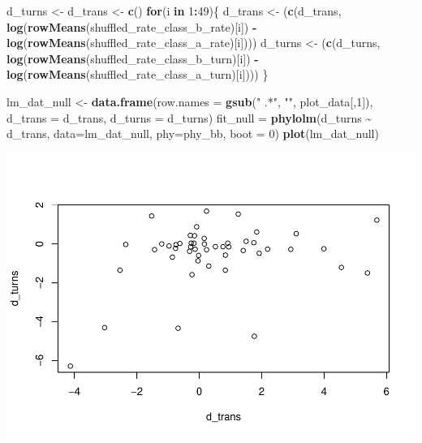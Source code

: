 \documentclass[
]{article}
\newenvironment{Shaded}{\begin{snugshade}}{\end{snugshade}}
\newcommand{\AttributeTok}[1]{\textcolor[rgb]{0.13,0.29,0.53}{#1}}
\newcommand{\ControlFlowTok}[1]{\textcolor[rgb]{0.13,0.29,0.53}{\textbf{#1}}}
\newcommand{\DecValTok}[1]{\textcolor[rgb]{0.00,0.00,0.81}{#1}}
\newcommand{\FunctionTok}[1]{\textcolor[rgb]{0.13,0.29,0.53}{\textbf{#1}}}
\newcommand{\NormalTok}[1]{#1}
\newcommand{\OtherTok}[1]{\textcolor[rgb]{0.56,0.35,0.01}{#1}}
\newcommand{\SpecialCharTok}[1]{\textcolor[rgb]{0.81,0.36,0.00}{\textbf{#1}}}
\newcommand{\StringTok}[1]{\textcolor[rgb]{0.31,0.60,0.02}{#1}}
\begin{document}
\begin{Shaded}
\begin{Highlighting}[]
\NormalTok{d\_turns }\OtherTok{\textless{}{-}}\NormalTok{ d\_trans }\OtherTok{\textless{}{-}} \FunctionTok{c}\NormalTok{()}
\ControlFlowTok{for}\NormalTok{(i }\ControlFlowTok{in} \DecValTok{1}\SpecialCharTok{:}\DecValTok{49}\NormalTok{)\{}
\NormalTok{  d\_trans }\OtherTok{\textless{}{-}}\NormalTok{ (}\FunctionTok{c}\NormalTok{(d\_trans, }\FunctionTok{log}\NormalTok{(}\FunctionTok{rowMeans}\NormalTok{(shuffled\_rate\_class\_b\_rate)[i]) }\SpecialCharTok{{-}} 
                  \FunctionTok{log}\NormalTok{(}\FunctionTok{rowMeans}\NormalTok{(shuffled\_rate\_class\_a\_rate)[i])))}
\NormalTok{  d\_turns }\OtherTok{\textless{}{-}}\NormalTok{ (}\FunctionTok{c}\NormalTok{(d\_turns, }\FunctionTok{log}\NormalTok{(}\FunctionTok{rowMeans}\NormalTok{(shuffled\_rate\_class\_b\_turn)[i]) }\SpecialCharTok{{-}} 
                  \FunctionTok{log}\NormalTok{(}\FunctionTok{rowMeans}\NormalTok{(shuffled\_rate\_class\_a\_turn)[i])))}
\NormalTok{\}}

\NormalTok{lm\_dat\_null }\OtherTok{\textless{}{-}} \FunctionTok{data.frame}\NormalTok{(}\AttributeTok{row.names =} \FunctionTok{gsub}\NormalTok{(}\StringTok{" .*"}\NormalTok{, }\StringTok{""}\NormalTok{, plot\_data[,}\DecValTok{1}\NormalTok{]),}
                     \AttributeTok{d\_trans =}\NormalTok{ d\_trans,}
                     \AttributeTok{d\_turns =}\NormalTok{ d\_turns)}
\NormalTok{fit\_null }\OtherTok{=} \FunctionTok{phylolm}\NormalTok{(d\_turns }\SpecialCharTok{\textasciitilde{}}\NormalTok{ d\_trans, }\AttributeTok{data=}\NormalTok{lm\_dat\_null, }\AttributeTok{phy=}\NormalTok{phy\_bb, }\AttributeTok{boot =} \DecValTok{0}\NormalTok{)}
\FunctionTok{plot}\NormalTok{(lm\_dat\_null)}
\end{Highlighting}
\end{Shaded}

\includegraphics{SX-regression-distribution_files/figure-latex/unnamed-chunk-4-1.pdf}
\end{document}
